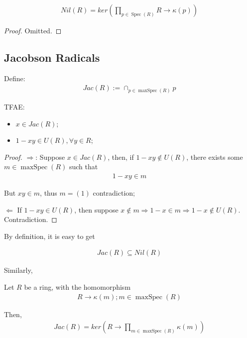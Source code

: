 \documentclass[Total.tex]{subfiles}
\begin{document}
					\begin{proposition}
						\begin{gather*}
							Nil(R)=ker(\prod_{p\in \operatorname{Spec}(R)} R\rightarrow \kappa(p))
						\end{gather*}
					\end{proposition}
					\begin{proof}
						Omitted.
					\end{proof}
				\subsection{Jacobson Radicals}
					\begin{Def}
						Define:
						\begin{gather*}
							Jac(R):=\cap_{p\in \operatorname{maxSpec}(R)} p
						\end{gather*}
					\end{Def}
					
					
					\begin{proposition}
						TFAE:
						\begin{itemize}
							\item $x\in Jac(R)$;
							\item $1-xy\in U(R),\forall y\in R$;
						\end{itemize}
					\end{proposition}
					\begin{proof}
						$\Rightarrow$: Suppose $x\in Jac(R)$, then, if $1-xy\notin U(R)$, there exists some $m\in \operatorname{maxSpec}(R)$ such that 
						\begin{gather*}
							1-xy\in m
						\end{gather*}
						
						But $xy\in m$, thus $m=(1)$ contradiction;
						
						$\Leftarrow$ If $1-xy\in U(R)$, then suppose $x\notin m\Rightarrow 1-x\in m\Rightarrow 1-x\notin U(R)$. Contradiction. 
					\end{proof}
					
					By definition, it is easy to get
					\begin{proposition}
						\begin{gather*}
							Jac(R)\subseteq Nil(R)
						\end{gather*}
					\end{proposition}
					
					
					Similarly,
					\begin{proposition}
						Let $R$ be a ring, with the homomorphism
						\begin{gather*}
							R\rightarrow \kappa(m);m\in \operatorname{maxSpec}(R)
						\end{gather*}
						
						Then,
						\begin{gather*}
							Jac(R)=ker(R\rightarrow \prod_{m\in \operatorname{maxSpec}(R)} \kappa(m))
						\end{gather*}
					\end{proposition}
\end{document}
